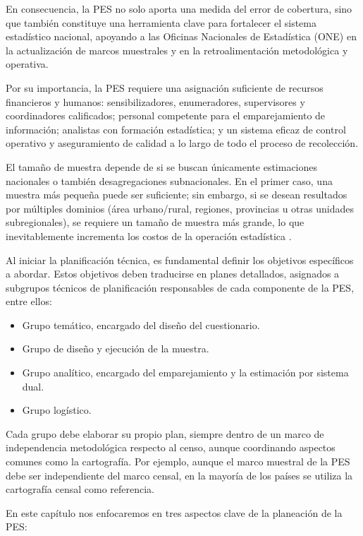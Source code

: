 \documentclass[
  12pt,
]{book}
\providecommand{\tightlist}{%
  \setlength{\itemsep}{0pt}\setlength{\parskip}{0pt}}
\begin{document}
En consecuencia, la PES no solo aporta una medida del error de cobertura, sino que también constituye una herramienta clave para fortalecer el sistema estadístico nacional, apoyando a las Oficinas Nacionales de Estadística (ONE) en la actualización de marcos muestrales y en la retroalimentación metodológica y operativa.

Por su importancia, la PES requiere una asignación suficiente de recursos financieros y humanos: sensibilizadores, enumeradores, supervisores y coordinadores calificados; personal competente para el emparejamiento de información; analistas con formación estadística; y un sistema eficaz de control operativo y aseguramiento de calidad a lo largo de todo el proceso de recolección.

El tamaño de muestra depende de si se buscan únicamente estimaciones nacionales o también desagregaciones subnacionales. En el primer caso, una muestra más pequeña puede ser suficiente; sin embargo, si se desean resultados por múltiples dominios (área urbano/rural, regiones, provincias u otras unidades subregionales), se requiere un tamaño de muestra más grande, lo que inevitablemente incrementa los costos de la operación estadística \citep{CEPAL_2023}.

Al iniciar la planificación técnica, es fundamental definir los objetivos específicos a abordar. Estos objetivos deben traducirse en planes detallados, asignados a subgrupos técnicos de planificación responsables de cada componente de la PES, entre ellos:

\begin{itemize}
\tightlist
\item
  Grupo temático, encargado del diseño del cuestionario.
\item
  Grupo de diseño y ejecución de la muestra.
\item
  Grupo analítico, encargado del emparejamiento y la estimación por sistema dual.
\item
  Grupo logístico.
\end{itemize}

Cada grupo debe elaborar su propio plan, siempre dentro de un marco de independencia metodológica respecto al censo, aunque coordinando aspectos comunes como la cartografía. Por ejemplo, aunque el marco muestral de la PES debe ser independiente del marco censal, en la mayoría de los países se utiliza la cartografía censal como referencia.

En este capítulo nos enfocaremos en tres aspectos clave de la planeación de la PES:
\end{document}
